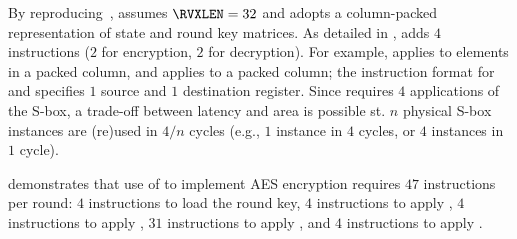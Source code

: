 
By reproducing~\cite[Section 4.2]{TilGro:06},
assumes 
$\RVXLEN = 32$
and adopts a 
column-packed 
representation of state and round key matrices.
As detailed in
,
adds
$ 4$
instructions ($2$ for encryption, $2$ for decryption).
For example,
applies 
to elements in   a packed column,
and
applies 
to               a packed column;
the instruction format for
and
specifies $1$ source and $1$ destination register.
Since 
requires $4$ applications of the S-box, a trade-off between latency and
area is possible st. 
$n$ physical S-box instances are (re)used in $4/n$ cycles
(e.g., $1$ instance in $4$ cycles, or $4$ instances in $1$ cycle).

demonstrates that use of  to implement AES encryption requires
$47$ instructions per round:
$ 4$            
     instructions to load the round key,
$ 4$            
     instructions to apply ,
$ 4$   
     instructions to apply ,
$31$ instructions to apply ,
and
$ 4$   
     instructions to apply .

